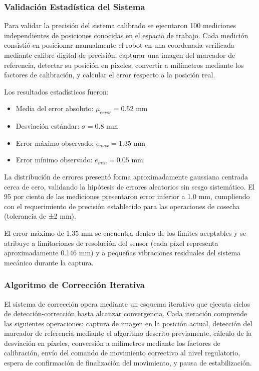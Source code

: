 \subsubsection{Validación Estadística del Sistema}

Para validar la precisión del sistema calibrado se ejecutaron 100 mediciones independientes de posiciones conocidas en el espacio de trabajo. Cada medición consistió en posicionar manualmente el robot en una coordenada verificada mediante calibre digital de precisión, capturar una imagen del marcador de referencia, detectar su posición en píxeles, convertir a milímetros mediante los factores de calibración, y calcular el error respecto a la posición real.

Los resultados estadísticos fueron:

\begin{itemize}
\item Media del error absoluto: $\mu_{error} = 0.52$ mm
\item Desviación estándar: $\sigma = 0.8$ mm
\item Error máximo observado: $e_{max} = 1.35$ mm
\item Error mínimo observado: $e_{min} = 0.05$ mm
\end{itemize}

La distribución de errores presentó forma aproximadamente gaussiana centrada cerca de cero, validando la hipótesis de errores aleatorios sin sesgo sistemático. El 95 por ciento de las mediciones presentaron error inferior a 1.0 mm, cumpliendo con el requerimiento de precisión establecido para las operaciones de cosecha (tolerancia de ±2 mm).

El error máximo de 1.35 mm se encuentra dentro de los límites aceptables y se atribuye a limitaciones de resolución del sensor (cada píxel representa aproximadamente 0.146 mm) y a pequeñas vibraciones residuales del sistema mecánico durante la captura.

\subsubsection{Algoritmo de Corrección Iterativa}

El sistema de corrección opera mediante un esquema iterativo que ejecuta ciclos de detección-corrección hasta alcanzar convergencia. Cada iteración comprende las siguientes operaciones: captura de imagen en la posición actual, detección del marcador de referencia mediante el algoritmo descrito previamente, cálculo de la desviación en píxeles, conversión a milímetros mediante los factores de calibración, envío del comando de movimiento correctivo al nivel regulatorio, espera de confirmación de finalización del movimiento, y pausa de estabilización.


